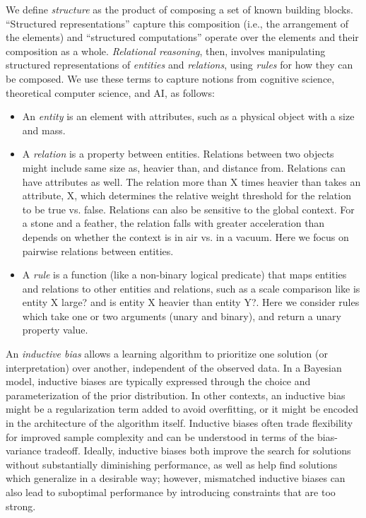 \documentclass[10pt]{book}
\let\defaultmarginpar\marginpar
\renewcommand\marginpar[2][]{\defaultmarginpar{\itshape\color{gray}#2}}
\begin{document}
We define \emph{structure} as the product of composing a set of known building blocks. ``Structured representations'' capture this composition (i.e., the arrangement of the elements) and ``structured computations'' operate over the elements and their composition as a whole. \emph{Relational reasoning}\marginpar{relational reasoning}, then, involves manipulating structured representations of \emph{entities} and \emph{relations}, using \emph{rules} for how they can be composed. We use these terms to capture notions from cognitive science, theoretical computer science, and AI, as follows:
\begin{itemize}
    \item An \emph{entity}\marginpar{entity} is an element with attributes, such as a physical object with a size and mass.
    \item A \emph{relation}\marginpar{relation} is a property between entities. Relations between two objects might include same size as, heavier than, and distance from. Relations can have attributes as well. The relation more than X times heavier than takes an attribute, X, which determines the relative weight threshold for the relation to be true vs. false. Relations can also be sensitive to the global context. For a stone and a feather, the relation falls with greater acceleration than depends on whether the context is in air vs. in a vacuum. Here we focus on pairwise relations between entities.
    \item A \emph{rule}\marginpar{rule} is a function (like a non-binary logical predicate) that maps entities and relations to other entities and relations, such as a scale comparison like is entity X large? and is entity X heavier than entity Y?. Here we consider rules which take one or two arguments (unary and binary), and return a unary property value.
\end{itemize}

An \emph{inductive bias}\marginpar{inductive bias} allows a learning algorithm to prioritize one solution (or interpretation) over another, independent of the observed data. In a Bayesian model, inductive biases are typically expressed through the choice and parameterization of the prior distribution. In other contexts, an inductive bias might be a regularization term added to avoid overfitting, or it might be encoded in the architecture of the algorithm itself. Inductive biases often trade flexibility for improved sample complexity and can be understood in terms of the bias-variance tradeoff. Ideally, inductive biases both improve the search for solutions without substantially diminishing performance, as well as help find solutions which generalize in a desirable way; however, mismatched inductive biases can also lead to suboptimal performance by introducing constraints that are too strong.
\end{document}
